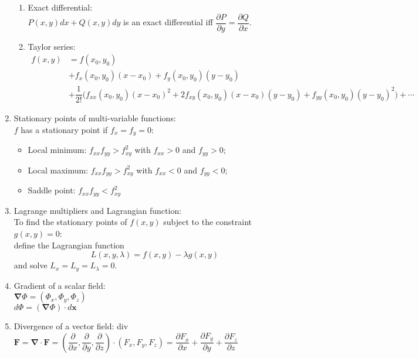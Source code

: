 \documentclass[fleqn]{article}
\begin{document}
\begin{enumerate}
\begin{enumerate}[1)]
            \item Exact differential:\\
                $P(x,y)dx+Q(x,y)dy$ is an exact differential iff $\dfrac{\partial P}{\partial y}=\dfrac{\partial Q}{\partial x}$.
            \item Taylor series:\\
                $\begin{aligned}
                    f(x,y) &= f(x_0,y_0)\\
                           &+ f_x(x_0,y_0)(x-x_0)+f_y(x_0,y_0)(y-y_0)\\
                           &+ \dfrac{1}{2!}\big(f_{xx}(x_0,y_0)(x-x_0)^2+2f_{xy}(x_0,y_0)(x-x_0)(y-y_0)+f_{yy}(x_0,y_0)(y-y_0)^2\big)+\cdots
                \end{aligned}$
        \end{enumerate}
    \item Stationary points of multi-variable functions:\\
        $f$ has a stationary point if $f_x=f_y=0$:
        \begin{itemize}[label={--}, topsep=0pt]
            \item Local minimum: $f_{xx}f_{yy}>f_{xy}^2$ with $f_{xx}>0$ and $f_{yy}>0$;
            \item Local maximum: $f_{xx}f_{yy}>f_{xy}^2$ with $f_{xx}<0$ and $f_{yy}<0$;
            \item Saddle point: $f_{xx}f_{yy}<f_{xy}^2$
        \end{itemize}
    \item Lagrange multipliers and Lagrangian function:\\
        To find the stationary points of $f(x,y)$ subject to the constraint $g(x,y)=0$:\\
        define the Lagrangian function
            \[L(x,y,\lambda)=f(x,y)-\lambda g(x,y)\]
        and solve $L_x=L_y=L_\lambda=0$.
    \item Gradient of a scalar field:\\
        $\bm{\nabla}\Phi=(\Phi_x,\Phi_y,\Phi_z)$\\
        $d\Phi=(\bm{\nabla}\Phi)\cdot d\bm{x}$
    \item Divergence of a vector field:\smallbreak
        div $\bm{F}=\bm{\nabla}\cdot\bm{F}=\left(\dfrac{\partial}{\partial x},\dfrac{\partial}{\partial y},\dfrac{\partial}{\partial z}\right)\cdot(F_x,F_y,F_z)=\dfrac{\partial F_x}{\partial x}+\dfrac{\partial F_y}{\partial y}+\dfrac{\partial F_z}{\partial z}$\smallbreak

\end{enumerate}
\end{document}
